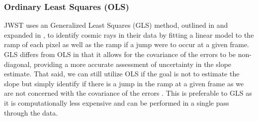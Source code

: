 \subsubsection{Ordinary Least Squares (OLS)}
JWST uses an Generalized Least Squares (GLS) method, outlined in \cite{robberto2014generalized} and expanded in \cite{robberto2015cr}, to identify cosmic rays in their data by fitting a linear model to the ramp of each pixel as well as the ramp if a jump were to occur at a given frame.
GLS differs from OLS in that it allows for the covariance of the errors to be non-diagonal, providing a more accurate assessment of uncertainty in the slope estimate.
That said, we can still utilize OLS if the goal is not to estimate the slope but simply identify if there is a jump in the ramp at a given frame as we are not concerned with the covariance of the errors \parencite{robberto2014generalized}.
This is preferable to GLS as it is computationally less expensive and can be performed in a single pass through the data.

